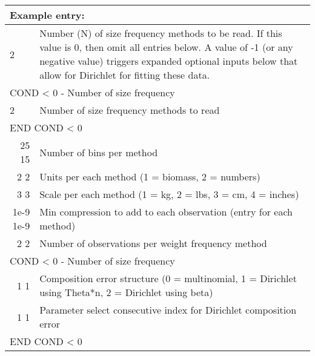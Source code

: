 \begin{center}
	\begin{tabular}{p{1.4cm} p{0.7cm} p{12.8 cm}}
		\multicolumn{3}{l}{Example entry:} \\
		\hline
		2 & & Number (N) of size frequency methods to be read. If this value is 0, then omit all entries below. A value of -1 (or any negative value) triggers expanded optional inputs below that allow for Dirichlet 
		for fitting these data. \Tstrut\Bstrut\\
		\hline
		\multicolumn{3}{l}{COND < 0 - Number of size frequency} \Tstrut\\
		\multicolumn{2}{l}{2} & Number of size frequency methods to read \Tstrut\\
		\multicolumn{3}{l}{END COND < 0} \Bstrut\\
		\hline
		\multicolumn{2}{r}{25 15} & Number of bins per method \Tstrut\\
		\multicolumn{2}{r}{2 2} & Units per each method (1 = biomass, 2 = numbers) \\
		\multicolumn{2}{r}{3 3} & Scale per each method (1 = kg, 2 = lbs, 3 = cm, 4 = inches) \\
		\multicolumn{2}{r}{1e-9 1e-9} & Min compression to add to each observation (entry for each method) \\
		\multicolumn{2}{r}{2 2} & Number of observations per weight frequency method \Bstrut\\
		\hline
		\multicolumn{3}{l}{COND < 0 - Number of size frequency} \Tstrut\\
		\multicolumn{2}{r}{1 1} & Composition error structure (0 = multinomial, 1 = Dirichlet using Theta*n, 2 = Dirichlet using beta) \Tstrut\\
		\multicolumn{2}{r}{1 1} & Parameter select consecutive index for Dirichlet 
		composition error \Bstrut\\
		\multicolumn{3}{l}{END COND < 0} \Tstrut\\
		\hline
	\end{tabular}
\end{center}


